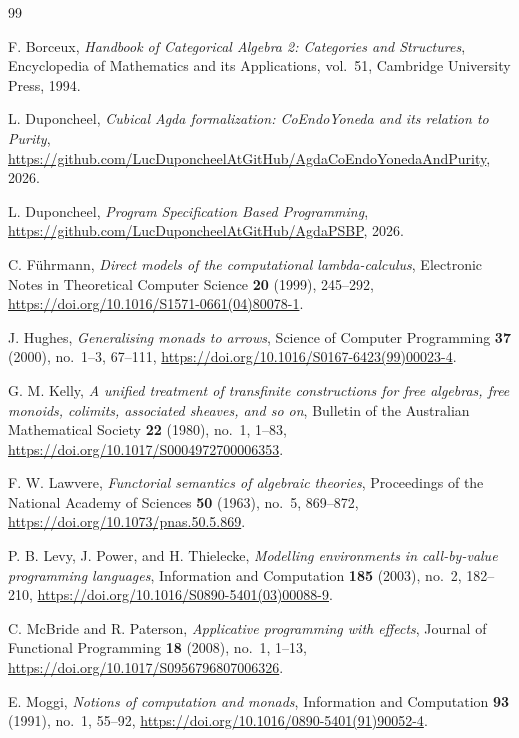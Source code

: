 \documentclass[11pt,a4paper]{article}
\theoremstyle{definition}
\theoremstyle{remark}
\begin{document}
\begin{thebibliography}{99}
\raggedright

F. Borceux,
\emph{Handbook of Categorical Algebra 2: Categories and Structures},
Encyclopedia of Mathematics and its Applications, vol.~51, Cambridge University Press, 1994.

L. Duponcheel,
\emph{Cubical Agda formalization: CoEndoYoneda and its relation to Purity}, \\
\url{https://github.com/LucDuponcheelAtGitHub/AgdaCoEndoYonedaAndPurity}, 2026.

L. Duponcheel,
\emph{Program Specification Based Programming}, \\
\url{https://github.com/LucDuponcheelAtGitHub/AgdaPSBP}, 2026.

C. F\"{u}hrmann,
\emph{Direct models of the computational lambda-calculus},
Electronic Notes in Theoretical Computer Science \textbf{20} (1999), 245--292,
\url{https://doi.org/10.1016/S1571-0661(04)80078-1}.

J. Hughes,
\emph{Generalising monads to arrows},
Science of Computer Programming \textbf{37} (2000), no.~1--3, 67--111,
\url{https://doi.org/10.1016/S0167-6423(99)00023-4}.

G. M. Kelly,
\emph{A unified treatment of transfinite constructions for free algebras, free monoids, colimits,
associated sheaves, and so on},
Bulletin of the Australian Mathematical Society \textbf{22} (1980), no.~1, 1--83,
\url{https://doi.org/10.1017/S0004972700006353}.

F. W. Lawvere,
\emph{Functorial semantics of algebraic theories},
Proceedings of the National Academy of Sciences \textbf{50} (1963), no.~5, 869--872,
\url{https://doi.org/10.1073/pnas.50.5.869}.

P. B. Levy, J. Power, and H. Thielecke,
\emph{Modelling environments in call-by-value programming languages},
Information and Computation \textbf{185} (2003), no.~2, 182--210,
\url{https://doi.org/10.1016/S0890-5401(03)00088-9}.

C. McBride and R. Paterson,
\emph{Applicative programming with effects},
Journal of Functional Programming \textbf{18} (2008), no.~1, 1--13,
\url{https://doi.org/10.1017/S0956796807006326}.

E. Moggi,
\emph{Notions of computation and monads},
Information and Computation \textbf{93} (1991), no.~1, 55--92,
\url{https://doi.org/10.1016/0890-5401(91)90052-4}.


\end{thebibliography}
\end{document}
